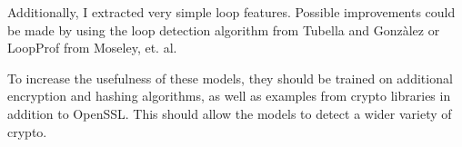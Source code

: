 Additionally, I extracted very simple loop features.  Possible improvements could be made by using the loop detection algorithm from Tubella and Gonz\`alez \cite{tubella} or LoopProf from Moseley, et. al\cite{Moseley}.

To increase the usefulness of these models, they should be trained on additional encryption and hashing algorithms, as well as examples from crypto libraries in addition to OpenSSL.  This should allow the models to detect a wider variety of crypto.

